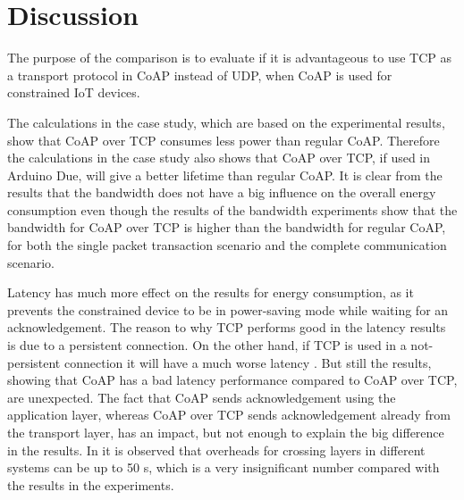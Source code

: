 \section{Discussion}\label{sec:discussion}
The purpose of the comparison is to evaluate if it is advantageous to use TCP as a transport protocol in CoAP instead of UDP, when CoAP is used for constrained IoT devices. 

The calculations in the case study, which are based on the experimental results, show that CoAP over TCP consumes less power than regular CoAP. Therefore the calculations in the case study also shows that CoAP over TCP, if used in Arduino Due, will give a better lifetime than regular CoAP. 
It is clear from the results that the bandwidth does not have a big influence on the overall energy consumption even though the results of the bandwidth experiments show that the bandwidth for CoAP over TCP is higher than the bandwidth for regular CoAP, for both the single packet transaction scenario and the complete communication scenario. 

Latency has much more effect on the results for energy consumption, as it prevents the constrained device to be in power-saving mode while waiting for an acknowledgement. 
The reason to why TCP performs good in the latency results is due to a persistent connection. 
On the other hand, if TCP is used in a not-persistent connection it will have a much worse latency \cite{ludovici2013tinycoap}. But still the results, showing that CoAP has a bad latency performance compared to CoAP over TCP, are unexpected.
The fact that CoAP sends acknowledgement using the application layer, whereas CoAP over TCP sends acknowledgement already from the transport layer, has an impact, but not enough to explain the big difference in the results. 
In \cite{hayden1997optimizing} it is observed that overheads for crossing layers in different systems can be up to 50 \textmu s, which is a very insignificant number compared with the results in the experiments.

